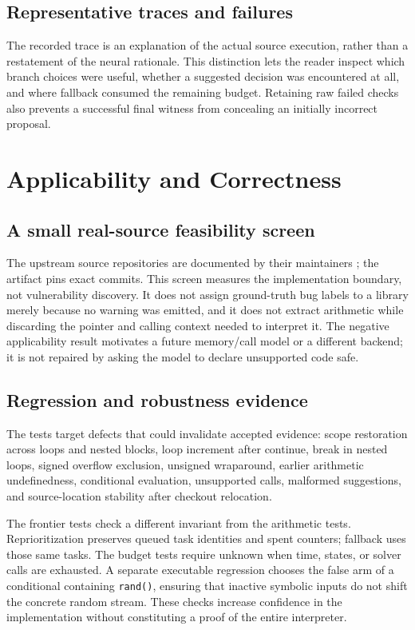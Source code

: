 \documentclass[sigconf]{acmart}
\begin{document}
\subsection{Representative traces and failures}
\CaseResultsVThree{}
The recorded trace is an explanation of the actual source execution,
rather than a restatement of the neural rationale. This distinction lets
the reader inspect which branch choices were useful, whether a suggested
decision was encountered at all, and where fallback consumed the remaining
budget. Retaining raw failed checks also prevents a successful final
witness from concealing an initially incorrect proposal.

\WitnessResultsVThree{}

\section{Applicability and Correctness}
\subsection{A small real-source feasibility screen}
\RealWorldScreenVThree{}
The upstream source repositories are documented by their maintainers
\cite{libpng,libsndfile,libtiff}; the artifact pins exact commits.
This screen measures the implementation boundary, not vulnerability
discovery. It does not assign ground-truth bug labels to a library merely
because no warning was emitted, and it does not extract arithmetic while
discarding the pointer and calling context needed to interpret it. The
negative applicability result motivates a future memory/call model or a
different backend; it is not repaired by asking the model to declare
unsupported code safe.

\subsection{Regression and robustness evidence}
\ValidationResultsVThree{}
The tests target defects that could invalidate accepted evidence:
scope restoration across loops and nested blocks, loop increment after
continue, break in nested loops, signed overflow exclusion, unsigned
wraparound, earlier arithmetic undefinedness, conditional evaluation,
unsupported calls, malformed suggestions, and source-location stability
after checkout relocation.

The frontier tests check a different invariant from the arithmetic tests.
Reprioritization preserves queued task identities and spent counters;
fallback uses those same tasks. The budget tests require unknown when
time, states, or solver calls are exhausted. A separate executable
regression chooses the false arm of a conditional containing \texttt{rand()},
ensuring that inactive symbolic inputs do not shift the concrete random
stream. These checks increase confidence in the implementation without
constituting a proof of the entire interpreter.
\end{document}

